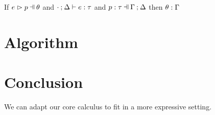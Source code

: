 \documentclass[runningheads,envcountsame,a4paper]{llncs}
\begin{document}
\begin{lemma}
  \label{lem:subs-typing}
  If $\hpatmatch{e}{p}{\theta}$ and $\cdot \mathbin{;} \Delta \vdash e : \tau$ and $\hpattyp{p}{\tau}{\Gamma}{\Delta}$
  then $\theta : \Gamma$
\end{lemma}

\section{Algorithm}\label{sec:algorithm}

\section{Conclusion}
We can adapt our core calculus to fit in a more expressive setting.
\clearpage



\end{document}
